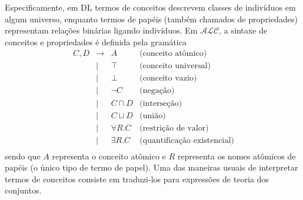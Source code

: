 \documentclass[hyphens,11pt,a4paper]{article}
\newcommand{\alc}{\ensuremath{\mathcal{ALC}}}
\newcommand{\dland}{\sqcap}         %
\newcommand{\dlor}{\sqcup}       %
\begin{document}
Especificamente, em DL termos de conceitos descrevem classes de indivíduos em algum universo, enquanto termos de papéis (também chamados de propriedades) representam relações binárias ligando indivíduos. Em \alc, a sintaxe de conceitos e propriedades é definida pela gramática
\[ 
		\begin{array}{rcll} 
			C, D  & \to    & A             & \textrm{(conceito atômico)} \\ 
					& \mid   &  \top         & \textrm{(conceito universal)} \\ 
					& \mid   &  \bot         & \textrm{(conceito vazio)} \\ 
					& \mid   &  \neg C       & \textrm{(negação)} \\ 
					& \mid   &  C \dland D   & \textrm{(interseção)} \\ 
					& \mid   &  C \dlor D    & \textrm{(união)} \\ 
					& \mid   &  \forall R.C  & \textrm{(restrição de valor)} \\ 
					& \mid   &  \exists R.C  & \textrm{(quantificação existencial)} \\
		\end{array} 
\] 
		 sendo que $A$ representa o conceito atômico e $R$ representa os nomes atômicos de papéis (o único tipo de termo de papel). 
		 Uma das maneiras usuais de interpretar termos de conceitos consiste em traduzi-los para expressões de teoria dos conjuntos. 
		
\end{document}
